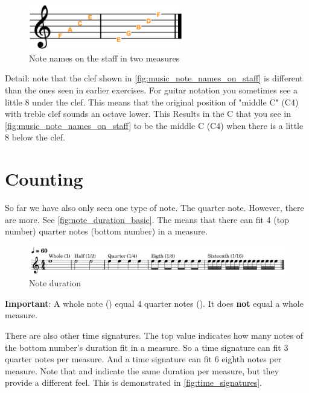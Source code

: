 \begin{figure}[h]
	\centering
	\includegraphics[width=0.6\textwidth]{../../Images/MusicNotation_MeasureNoteNames.png}
	\caption{Note names on the staff in two measures}
	\label{fig:music_note_names_on_staff}
\end{figure}

Detail: note that the clef shown in \autoref{fig:music_note_names_on_staff} is different than the ones seen in earlier exercises. For guitar notation you sometimes see a little 8 under the clef. This means that the original position of "middle C" (C4) with treble clef sounds an octave lower. This Results in the C that you see in \autoref{fig:music_note_names_on_staff} to be the middle C (C4) when there is a little 8 below the clef.

\newpage

\section{Counting}

So far we have also only seen one type of note. The quarter note. However, there are more. See \autoref{fig:note_duration_basic}. The  means that there can fit 4 (top number) quarter notes (bottom number) in a measure. 

\begin{figure}[h]
	\centering
	\includegraphics[width=\textwidth]{../../MuseScore/Guitar/MusicNotation/NoteDurations_Basic.png}
	\caption{Note duration}
	\label{fig:note_duration_basic}
\end{figure}

\textbf{Important}: A whole note (\wholeNote) equal 4 quarter notes (\quarterNote). It does \textbf{not} equal a whole measure. \newline

There are also other time signatures. The top value indicates how many notes of the bottom number's duration fit in a measure. So a  time signature can fit 3 quarter notes per measure. And a  time signature can fit 6 eighth notes per measure. Note that  and  indicate the same duration per measure, but they provide a different feel. This is demonstrated in \autoref{fig:time_signatures}.

